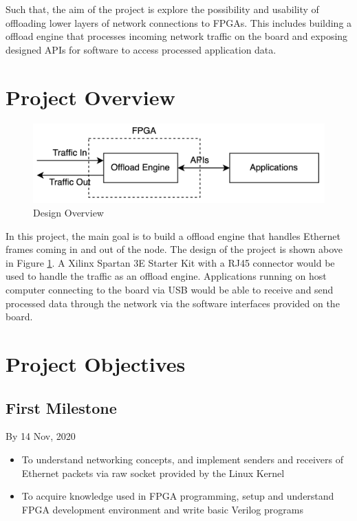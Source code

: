 \documentclass[a4paper,11pt]{scrartcl}
\begin{document}
Such that, the aim of the project is explore the possibility and usability of offloading lower layers of network connections to FPGAs. This includes building a offload engine that processes incoming network traffic on the board and exposing designed APIs for software to access processed application data.

\section{Project Overview}
\begin{figure}[h]
    \includegraphics[width=\textwidth]{imgs/design.png}
    \caption{Design Overview}
    \label{design-overview}
\end{figure}

In this project, the main goal is to build a offload engine that handles Ethernet frames coming in and out of the node. The design of the project is shown above in Figure \ref{design-overview}. A Xilinx Spartan 3E Starter Kit with a RJ45 connector would be used to handle the traffic as an offload engine. Applications running on host computer connecting to the board via USB would be able to receive and send processed data through the network via the software interfaces provided on the board.

\section{Project Objectives}

\subsection{First Milestone}
By 14 Nov, 2020
\begin{itemize}
    \item To understand networking concepts, and implement senders and receivers of Ethernet packets via raw socket provided by the Linux Kernel
    \item To acquire knowledge used in FPGA programming, setup and understand FPGA development environment and write basic Verilog programs
\end{itemize}
\end{document}
